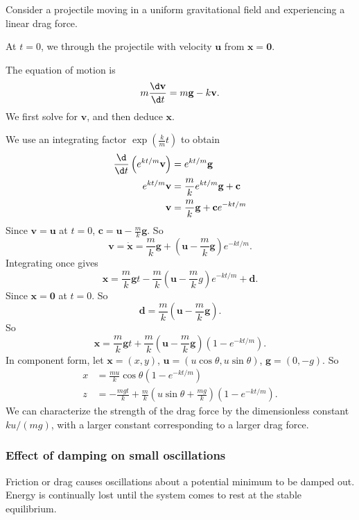 \documentclass[a4paper]{article}
\begin{document}
\begin{eg}
  Consider a projectile moving in a uniform gravitational field and experiencing a linear drag force.

  At $t = 0$, we through the projectile with velocity $\mathbf{u}$ from $\mathbf{x} = \mathbf{0}$.

  The equation of motion is
  \[
    m\frac{\d \mathbf{v}}{\d t} = m\mathbf{g} - k\mathbf{v}.
  \]
  We first solve for $\mathbf{v}$, and then deduce $\mathbf{x}$.

  We use an integrating factor $\exp(\frac{k}{m}t)$ to obtain
  \begin{align*}
    \frac{\d }{\d t} \left(e^{kt/m}\mathbf{v}\right) &= e^{kt/m} \mathbf{g}\\
    e^{kt/m} \mathbf{v}&= \frac{m}{k}e^{kt/m}\mathbf{g} + \mathbf{c}\\
    \mathbf{v} &= \frac{m}{k}\mathbf{g} + \mathbf{c} e^{-kt/m}
  \end{align*}
  Since $\mathbf{v} = \mathbf{u}$ at $t = 0$, $\mathbf{c} = \mathbf{u} - \frac{m}{k}\mathbf{g}$. So
  \[
    \mathbf{v} = \dot{\mathbf{x}} = \frac{m}{k}\mathbf{g} + \left(\mathbf{u} - \frac{m}{k}\mathbf{g}\right)e^{-kt/m}.
  \]
  Integrating once gives
  \[
    \mathbf{x} = \frac{m}{k}\mathbf{g}t - \frac{m}{k}\left(\mathbf{u} - \frac{m}{k} g\right) e^{-kt/m} + \mathbf{d}.
  \]
  Since $\mathbf{x} = \mathbf{0}$ at $t = 0$. So
  \[
    \mathbf{d} = \frac{m}{k}\left(\mathbf{u} - \frac{m}{k}\mathbf{g}\right).
  \]
  So
  \[
    \mathbf{x} = \frac{m}{k}\mathbf{g}t + \frac{m}{k}\left (\mathbf{u} - \frac{m}{k}\mathbf{g}\right)(1 - e^{-kt/m}).
  \]
  In component form, let $\mathbf{x} = (x, y)$, $\mathbf{u} = (u\cos \theta, u\sin \theta)$, $\mathbf{g} = (0, -g)$. So
  \begin{align*}
    x &= \frac{mu}{k}\cos \theta (1 - e^{-kt/m})\\
    z &= -\frac{mgt}{k} + \frac{m}{k}\left(u\sin \theta + \frac{mg}{k}\right)(1 - e^{-kt/m}).
  \end{align*}
  We can characterize the strength of the drag force by the dimensionless constant $ku/(mg)$, with a larger constant corresponding to a larger drag force. 
\end{eg}
\subsubsection{Effect of damping on small oscillations}
Friction or drag causes oscillations about a potential minimum to be damped out. Energy is continually lost until the system comes to rest at the stable equilibrium.
\end{document}
